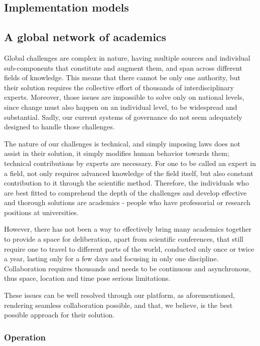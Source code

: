 \documentclass[a4paper,11pt]{article}
\begin{document}
\begin{multicols}{2}
\section{Implementation models} \label{implementation}

\subsection{A global network of academics} \label{academics}

Global challenges are complex in nature, having multiple sources and individual sub-components that constitute and augment them, and span across different fields of knowledge. This means that there cannot be only one authority, but their solution requires the collective effort of thousands of interdisciplinary experts. Moreover, those issues are impossible to solve only on national levels, since change must also happen on an individual level, to be widespread and substantial. Sadly, our current systems of governance do not seem adequately designed to handle those challenges.

The nature of our challenges is technical, and simply imposing laws does not assist in their solution, it simply modifies human behavior towards them; technical contributions by experts are necessary. For one to be called an expert in a field, not only requires advanced knowledge of the field itself, but also constant contribution to it through the scientific method. Therefore, the individuals who are best fitted to comprehend the depth of the challenges and develop effective and thorough solutions are academics - people who have professorial or research positions at universities.

However, there has not been a way to effectively bring many academics together to provide a space for deliberation, apart from scientific conferences, that still require one to travel to different parts of the world, conducted only once or twice a year, lasting only for a few days and focusing in only one discipline. Collaboration requires thousands and needs to be continuous and asynchronous, thus space, location and time pose serious limitations.

These issues can be well resolved through our platform, as aforementioned, rendering seamless collaboration possible, and that, we believe, is the best possible approach for their solution.

\subsubsection{Operation} \label{operationacademics}


\end{multicols}
\end{document}
